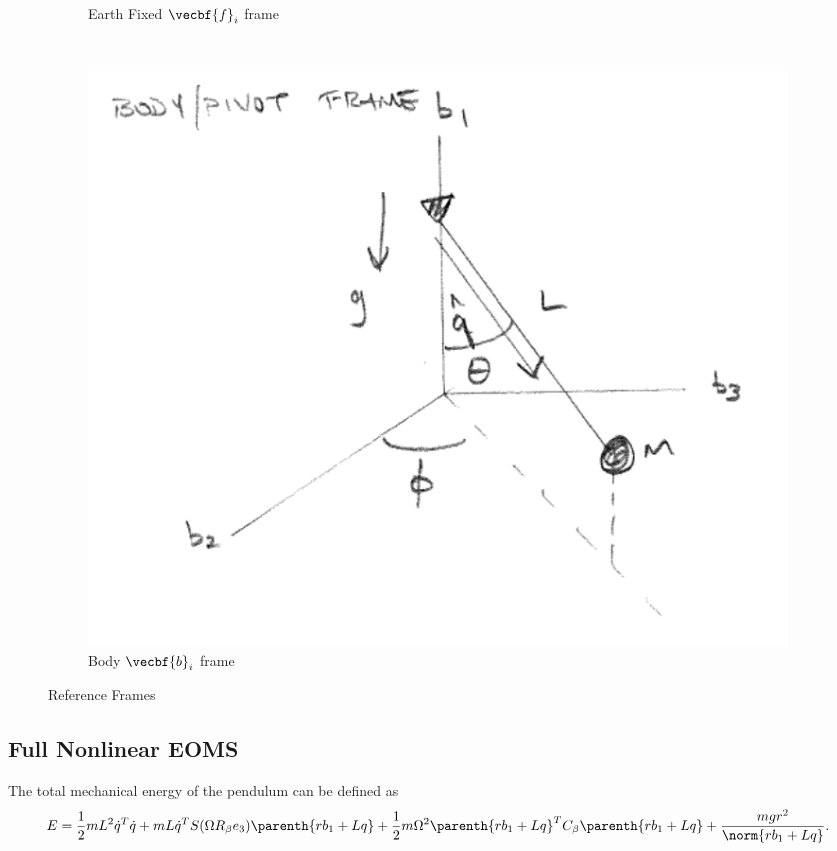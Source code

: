 \documentclass[11pt, reqno]{article}   	%
\begin{document}
\begin{figure}[htbp]
\begin{subfigure}[htbp]{0.3\textwidth}
        \caption{Earth Fixed \( \vecbf{f}_i \) frame} \label{fig:earth_fixed} 
    \end{subfigure}~ %
    \begin{subfigure}[htbp]{0.3\textwidth} 
        \includegraphics[width=\textwidth]{figures/body_frame.pdf} 
        \caption{Body \( \vecbf{b}_i \) frame} \label{fig:body} 
    \end{subfigure} 
    \caption{Reference Frames}
    \label{fig:reference_frames} 
\end{figure}
\subsection*{Full Nonlinear EOMS}

The total mechanical energy of the pendulum can be defined as 
\begin{align*}
    E = \frac{1}{2} m L^2 \dot{q}^T \dot{q} + m L \dot{q}^T S(\Omega R_\beta e_3) \parenth{r b_1 + L q} + \frac{1}{2}m  \Omega^2 \parenth{r b_1 + L q}^T C_\beta \parenth{r b_1 + L q} + \frac{mgr^2}{\norm{r b_1 + L q}}.
\end{align*}
\end{document}
